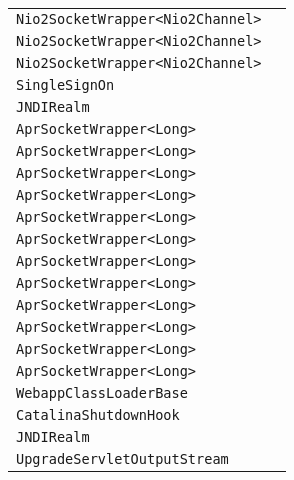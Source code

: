 \begin{center}
\begin{tabular}{ll}
\lstinline/Nio2SocketWrapper<Nio2Channel>/&\raisebox{0pt}{\lstinline/ doClientAuth(SSLSupport)/}\\ 
\lstinline/Nio2SocketWrapper<Nio2Channel>/&\raisebox{0pt}{\lstinline/ doClientAuth(SSLSupport)/}\\ 
\lstinline/Nio2SocketWrapper<Nio2Channel>/&\raisebox{0pt}{\lstinline/ doClientAuth(SSLSupport)/}\\ 
\lstinline/SingleSignOn/&\raisebox{0pt}{\lstinline/ expire(SingleSignOnSessionKeykey)/}\\ 
\lstinline/JNDIRealm/&\raisebox{0pt}{\lstinline/ startInternal())/}\\ 
\lstinline/AprSocketWrapper<Long>/&\raisebox{0pt}{\lstinline/ populateLocalPort()/}\\ 
\lstinline/AprSocketWrapper<Long>/&\raisebox{0pt}{\lstinline/ populateLocalPort()/}\\ 
\lstinline/AprSocketWrapper<Long>/&\raisebox{0pt}{\lstinline/ populateLocalPort()/}\\ 
\lstinline/AprSocketWrapper<Long>/&\raisebox{0pt}{\lstinline/ populateLocalPort()/}\\ 
\lstinline/AprSocketWrapper<Long>/&\raisebox{0pt}{\lstinline/ populateLocalPort()/}\\ 
\lstinline/AprSocketWrapper<Long>/&\raisebox{0pt}{\lstinline/ populateLocalPort()/}\\ 
\lstinline/AprSocketWrapper<Long>/&\raisebox{0pt}{\lstinline/ populateLocalPort()/}\\ 
\lstinline/AprSocketWrapper<Long>/&\raisebox{0pt}{\lstinline/ populateLocalPort()/}\\ 
\lstinline/AprSocketWrapper<Long>/&\raisebox{0pt}{\lstinline/ populateLocalPort()/}\\ 
\lstinline/AprSocketWrapper<Long>/&\raisebox{0pt}{\lstinline/ populateLocalPort()/}\\ 
\lstinline/AprSocketWrapper<Long>/&\raisebox{0pt}{\lstinline/ populateLocalPort()/}\\ 
\lstinline/AprSocketWrapper<Long>/&\raisebox{0pt}{\lstinline/ populateLocalPort()/}\\ 
\lstinline/WebappClassLoaderBase/&\raisebox{0pt}{\lstinline/ findClassInternal(String)/}\\ 
\lstinline/CatalinaShutdownHook/&\raisebox{0pt}{\lstinline/ run()/}\\ 
\lstinline/JNDIRealm/&\raisebox{0pt}{\lstinline/ startInternal())/}\\ 
\lstinline/UpgradeServletOutputStream/&\raisebox{0pt}{\lstinline/ onError(Throwablet)/}\\ 

\end{tabular}
\end{center}
